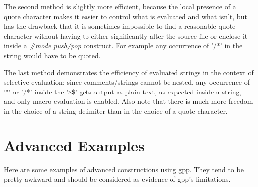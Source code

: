 The second method is slightly more efficient, because the local presence of a
quote character makes it easier to control what is evaluated and what isn't,
but has the drawback that it is sometimes impossible to find a reasonable
quote character without having to either significantly alter the source file
or enclose it inside a {\it \#mode push/pop} construct. For example any
occurrence of '/*' in the string would have to be quoted.

The last method demonstrates the efficiency of evaluated strings in the
context of selective evaluation: since comments/strings cannot be nested,
any occurrence of '"' or '/*' inside the '\$\$' gets output as plain text,
as expected inside a string, and only macro evaluation is enabled. Also note
that there is much more freedom in the choice of a string delimiter than
in the choice of a quote character.
\section{Advanced Examples}


Here are some examples of advanced constructions using gpp. They tend to
be pretty awkward and should be considered as evidence of gpp's limitations.


